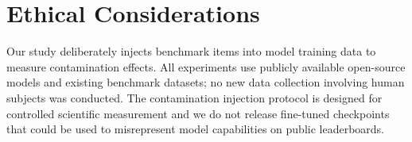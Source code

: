 \section*{Ethical Considerations}

Our study deliberately injects benchmark items into model training data to measure contamination effects. All experiments use publicly available open-source models and existing benchmark datasets; no new data collection involving human subjects was conducted. The contamination injection protocol is designed for controlled scientific measurement and we do not release fine-tuned checkpoints that could be used to misrepresent model capabilities on public leaderboards.
